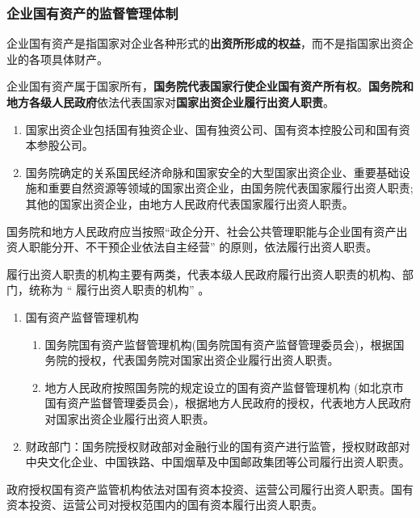\documentclass[UTF8,12pt]{ctexart}
\numberwithin{equation}{section} %
\numberwithin{figure}{section}
\numberwithin{table}{section}
\begin{document}
	\subsubsection{企业国有资产的监督管理体制}
	
	企业国有资产是指国家对企业各种形式的\textbf{出资所形成的权益}，而不是指国家出资企业的各项具体财产。
	
	企业国有资产属于国家所有，\textbf{国务院代表国家行使企业国有资产所有权}。\textbf{国务院和地方各级人民政府}依法代表国家对\textbf{国家出资企业履行出资人职责}。
	\begin{enumerate}
		\item 国家出资企业包括国有独资企业、国有独资公司、国有资本控股公司和国有资本参股公司。
		
		\item 国务院确定的关系国民经济命脉和国家安全的大型国家出资企业、重要基础设施和重要自然资源等领域的国家出资企业，由国务院代表国家履行出资人职责;其他的国家出资企业，由地方人民政府代表国家履行出资人职责。
	\end{enumerate}
	
	国务院和地方人民政府应当按照“政企分开、社会公共管理职能与企业国有资产出资人职能分开、不干预企业依法自主经营” 的原则，依法履行出资人职责。
	
	履行出资人职责的机构主要有两类，代表本级人民政府履行出资人职责的机构、部门，统称为 “ 履行出资人职责的机构” 。
	\begin{enumerate}
		\item 国有资产监督管理机构
		\begin{enumerate}
			\item 国务院国有资产监督管理机构(国务院国有资产监督管理委员会)，根据国务院的授权，代表国务院对国家出资企业履行出资人职责。
			
			\item 地方人民政府按照国务院的规定设立的国有资产监督管理机构 (如北京市国有资产监督管理委员会)，根据地方人民政府的授权，代表地方人民政府对国家出资企业履行出资人职责。
			
		\end{enumerate}
		
		\item 财政部门：国务院授权财政部对金融行业的国有资产进行监管，授权财政部对中央文化企业、中国铁路、中国烟草及中国邮政集团等公司履行出资人职责。
	\end{enumerate}
	
	政府授权国有资产监管机构依法对国有资本投资、运营公司履行出资人职责。国有资本投资、运营公司对授权范围内的国有资本履行出资人职责。
	
\end{document}
